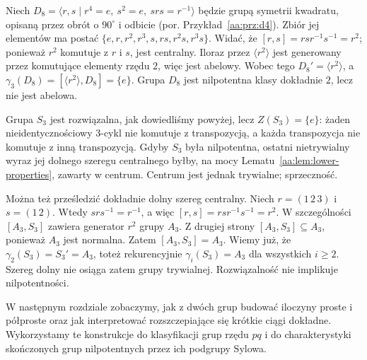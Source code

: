 \begin{przyklad}
\label{aa:prz:d8-nilpotent}
Niech $D_8=\langle r,s\mid r^4=e,\ s^2=e,\ srs=r^{-1}\rangle$
będzie grupą symetrii kwadratu, opisaną przez obrót o $90^\circ$
i odbicie (por. Przykład~\ref{aa:prz:d4}).
Zbiór jej elementów ma postać
$\{e,r,r^2,r^3,s,rs,r^2s,r^3s\}$.
Widać, że $[r,s]=rsr^{-1}s^{-1}=r^2$;
ponieważ $r^2$ komutuje z $r$ i $s$, jest centralny.
Iloraz przez $\langle r^2\rangle$ jest generowany przez
komutujące elementy rzędu $2$, więc jest abelowy.
Wobec tego $D_8'=\langle r^2\rangle$,
a $\gamma_3(D_8)=[\langle r^2\rangle,D_8]=\{e\}$.
Grupa $D_8$ jest nilpotentna klasy dokładnie $2$, lecz nie jest abelowa.
\end{przyklad}

\begin{przyklad}
\label{aa:prz:s3-notnil}
Grupa $S_3$ jest rozwiązalna, jak dowiedliśmy powyżej,
lecz $Z(S_3)=\{e\}$: żaden nieidentycznościowy
$3$-cykl nie komutuje z transpozycją, a każda transpozycja
nie komutuje z inną transpozycją.
Gdyby $S_3$ była nilpotentna, ostatni nietrywialny wyraz
jej dolnego szeregu centralnego byłby, na mocy
Lematu~\ref{aa:lem:lower-properties}, zawarty w centrum.
Centrum jest jednak trywialne; sprzeczność.

Można też prześledzić dokładnie dolny szereg centralny.
Niech $r=(1\,2\,3)$ i $s=(1\,2)$.
Wtedy $srs^{-1}=r^{-1}$, a więc
$[r,s]=rsr^{-1}s^{-1}=r^2$.
W szczególności $[A_3,S_3]$ zawiera generator $r^2$
grupy $A_3$. Z drugiej strony
$[A_3,S_3]\subseteq A_3$, ponieważ $A_3$ jest normalna.
Zatem $[A_3,S_3]=A_3$. Wiemy już, że
$\gamma_2(S_3)=S_3'=A_3$, toteż rekurencyjnie
$\gamma_i(S_3)=A_3$ dla wszystkich $i\ge2$.
Szereg dolny nie osiąga zatem grupy trywialnej.
Rozwiązalność nie implikuje nilpotentności.
\end{przyklad}

\enlargethispage{3\baselineskip}
\begin{uwaga}
W następnym rozdziale zobaczymy, jak z dwóch grup budować
iloczyny proste i półproste oraz jak interpretować rozszczepiające
się krótkie ciągi dokładne. Wykorzystamy te konstrukcje
do klasyfikacji grup rzędu $pq$ i do charakterystyki
skończonych grup nilpotentnych przez ich podgrupy Sylowa.
\end{uwaga}
